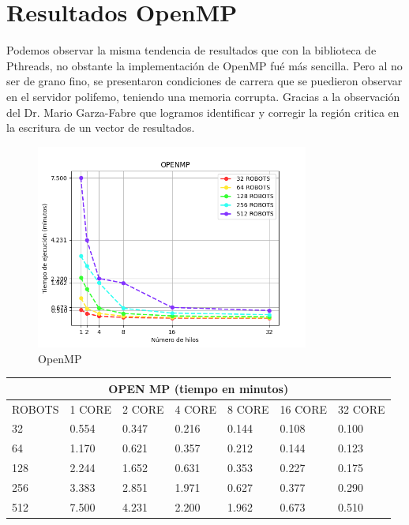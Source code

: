 \documentclass[oneside,twocolumn]{article}
\begin{document}
\newpage
\onecolumn
\section{Resultados OpenMP}

Podemos observar la misma tendencia de resultados que con la biblioteca de Pthreads, no obstante la implementación de OpenMP fué más sencilla. Pero al no ser de grano fino, se presentaron condiciones de carrera que se puedieron observar en el servidor polifemo, teniendo una memoria corrupta. Gracias a la observación del Dr. Mario Garza-Fabre que logramos identificar y corregir la región critica en la escritura de un vector de resultados.

\begin{figure}[h]
    \centering
    \includegraphics[width=0.80\textwidth]{graficos/openmp/openmp.png}
    \caption{OpenMP}
    \label{fig:secuencial}
\end{figure}

\begin{center}
\begin{tabular}{ |p{2cm}||p{2cm}||p{2cm}||p{2cm}||p{2cm}||p{2cm}||p{2cm}| }
 \hline
 \multicolumn{7}{|c|}{OPEN MP (tiempo en minutos)} \\
 \hline
 ROBOTS & 1 CORE & 2 CORE & 4 CORE & 8 CORE & 16 CORE & 32 CORE\\
 \hline
 32   & 0.554 & 0.347 & 0.216 & 0.144 & 0.108 & 0.100\\ \hline
 64   & 1.170 & 0.621 & 0.357 & 0.212 & 0.144 & 0.123\\ \hline
 128  & 2.244 & 1.652 & 0.631 & 0.353 & 0.227 & 0.175\\ \hline
 256  & 3.383 & 2.851 & 1.971 & 0.627 & 0.377 & 0.290\\ \hline
 512  & 7.500 & 4.231 & 2.200 & 1.962 & 0.673 & 0.510\\ \hline
 \hline
\end{tabular}
\end{center}
\end{document}
